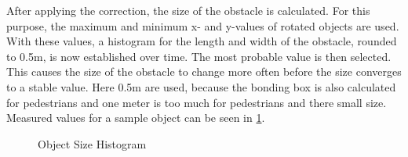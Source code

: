 \documentclass[11pt,oneside,openright]{mpreport}
\begin{document}

After applying the correction, the size of the obstacle is calculated. For this purpose, the maximum and minimum x- and y-values of
rotated objects are used. With these values, a histogram for the length and width of the obstacle, rounded to 0.5m, is now established over time.
The most probable value is then selected. This causes the size of the obstacle to change more often before the size converges to a stable value.
Here 0.5m are used, because the bonding box is also calculated for pedestrians and one meter is too much for pedestrians and there small size.
Measured values for a sample object can be seen in \cref{obst_hist}.
\begin{figure}[!ht]
\begin{center}
\caption{Object Size Histogram}
\label{obst_hist}
\end{center}
\end{figure}
\end{document}
